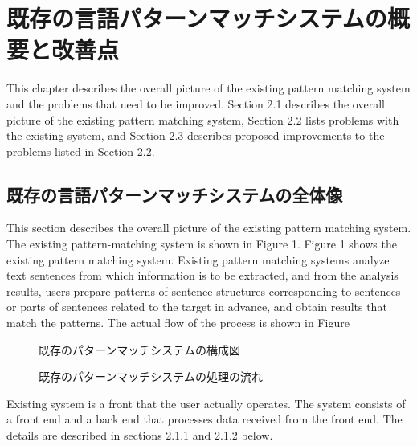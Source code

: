 
\section{既存の言語パターンマッチシステムの概要と改善点}





This chapter describes the overall picture of the existing pattern matching system and the problems that need to be improved. Section 2.1 describes the overall picture of the existing pattern matching system, Section 2.2 lists problems with the existing system, and Section 2.3 describes proposed improvements to the problems listed in Section 2.2.


\subsection{既存の言語パターンマッチシステムの全体像}


This section describes the overall picture of the existing pattern matching system. The existing pattern-matching system is shown in Figure 1.
Figure 1 shows the existing pattern matching system.
Existing pattern matching systems analyze text sentences from which information is to be extracted, and from the analysis results, users prepare patterns of sentence structures corresponding to sentences or parts of sentences related to the target in advance, and obtain results that match the patterns. The actual flow of the process is shown in Figure%
\begin{figure}[htbp]
\centering
\caption{既存のパターンマッチシステムの構成図}
\label{figure:1}
\end{figure}
\begin{figure}[htbp]
\centering
\caption{既存のパターンマッチシステムの処理の流れ}
\label{figure:2}
\end{figure}
Existing system is a front that the user actually operates. The system consists of a front end and a back end that processes data received from the front end.
The details are described in sections 2.1.1 and 2.1.2 below.

